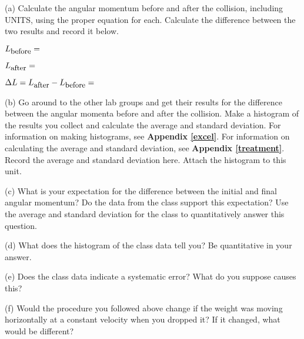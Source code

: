 (a) Calculate the angular momentum before and after the collision, including UNITS, using the proper equation for each. Calculate the difference between the two results and record it below. 
\vspace{5mm}

\( L_{\mbox{\small before}}= \)  
\vspace{5mm}

\( L_{\mbox{\small after}}= \)
\vspace{5mm}

\( \Delta L= L_{\mbox{\small after}} - L_{\mbox{\small before}} = \)  
\vspace{5mm}

(b) Go around to the other lab groups and get their results for the difference between the angular momenta before and after the collision.
Make a histogram of the results you collect and calculate the average and standard deviation.
For information on making histograms, see \textbf{Appendix \ref{excel}}. For information on calculating the average and standard deviation, see \textbf{Appendix \ref{treatment}}. 
Record the average and standard deviation here. Attach the histogram to this unit.
\vspace{25mm}



(c) What is your expectation for the difference between the initial and final angular momentum?
Do the data from the class support this expectation? 
Use the average and standard deviation for the class to quantitatively answer this question.
\vspace{25mm}

(d) What does the histogram of the class data tell you? Be quantitative in your answer.
\vspace{25mm}

(e) Does the class data indicate a systematic error?  What do you suppose causes this?
\vspace{25mm}

(f) Would the procedure you followed above change if the weight was moving horizontally at a constant velocity when you dropped it? 
If it changed, what would be different?
\vspace{20mm}

